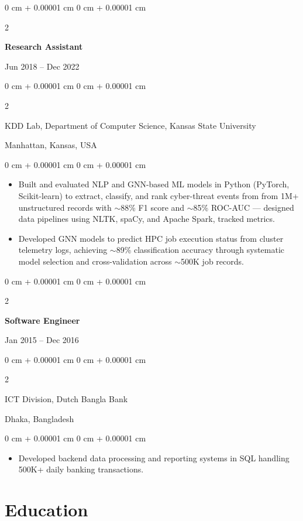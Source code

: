 \documentclass[10pt, letterpaper]{article}
\newenvironment{highlights}{
    \begin{itemize}[
        topsep=0.10 cm,
        parsep=0.10 cm,
        partopsep=0pt,
        itemsep=0pt,
        leftmargin=0 cm + 10pt
    ]
}{
    \end{itemize}
} %
\newenvironment{onecolentry}{
    \begin{adjustwidth}{
        0 cm + 0.00001 cm
    }{
        0 cm + 0.00001 cm
    }
}{
    \end{adjustwidth}
} %
\newenvironment{twocolentry}[2][]{
    \onecolentry
    \def\secondColumn{#2}
    \setcolumnwidth{\fill, 4.5 cm}
    \begin{paracol}{2}
}{
    \switchcolumn \raggedleft \secondColumn
    \end{paracol}
    \endonecolentry
} %
\begin{document}
    \vspace{1mm}

    \begin{twocolentry}{Jun 2018 -- Dec 2022}
        \textbf{Research Assistant}
    \end{twocolentry}
    \begin{twocolentry}{Manhattan, Kansas, USA}
       KDD Lab, Department of Computer Science, Kansas State University
    \end{twocolentry}
    \vspace{0.10 cm}
    \begin{onecolentry}
        \begin{highlights}
            \item Built and evaluated NLP and GNN-based ML models in Python (PyTorch, Scikit-learn) to extract, classify, and rank cyber-threat events from from 1M+ unstructured records with $\sim$88\% F1 score and $\sim$85\% ROC-AUC — designed data pipelines using NLTK, spaCy, and Apache Spark, tracked metrics.
            \item Developed GNN models to predict HPC job execution status from cluster telemetry logs, achieving $\sim$89\% classification accuracy through systematic model selection and cross-validation across $\sim$500K job records.
        \end{highlights}
    \end{onecolentry}

    \vspace{0.1 cm}
    \begin{twocolentry}{Jan 2015 -- Dec 2016}
        \textbf{Software Engineer}
    \end{twocolentry}
    \begin{twocolentry}{Dhaka, Bangladesh}
       ICT Division, Dutch Bangla Bank
    \end{twocolentry}

    \begin{onecolentry}
        \begin{highlights}
            \item Developed backend data processing and reporting systems in SQL handling 500K+ daily banking transactions.
        \end{highlights}
    \end{onecolentry}

\section{Education}
\end{document}
